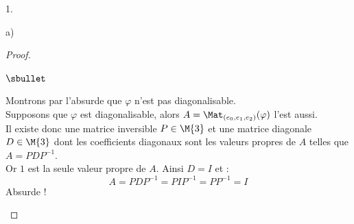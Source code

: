 \documentclass[11pt]{article}%
\begin{document}
\begin{noliste}{1.}
\begin{noliste}{a)}
\begin{proof}
\begin{noliste}{$\sbullet$}
      \item Montrons par l'absurde que $\varphi$ n'est pas diagonalisable.\\
        Supposons que $\varphi$ est diagonalisable, alors $A =
        \Mat_{(e_0, e_1, e_2)}(\varphi)$ l'est aussi.\\
        Il existe donc une matrice inversible $P \in \M{3}$ et une
        matrice diagonale $D \in \M{3}$ dont les coefficients
        diagonaux sont les valeurs propres de $A$ telles que $A =
        PDP^{-1}$.\\
        Or $1$ est la seule valeur propre de $A$. Ainsi $D = I$ et :
        \[
        A = PDP^{-1} = PIP^{-1} = PP^{-1} = I
        \]
        Absurde !%


        \newpage



\end{noliste}
\end{proof}
\end{noliste}
\end{noliste}
\end{document}
